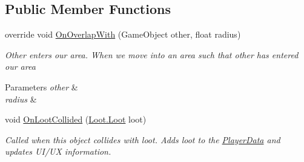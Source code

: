 \subsection*{Public Member Functions}
\begin{DoxyCompactItemize}
\item 
\hypertarget{class_skyrates_1_1_entity_1_1_entity_player_ship_ad4bfa608f86d94a38367b75f9fc32f21}{override void \hyperlink{class_skyrates_1_1_entity_1_1_entity_player_ship_ad4bfa608f86d94a38367b75f9fc32f21}{On\-Overlap\-With} (Game\-Object other, float radius)}\label{class_skyrates_1_1_entity_1_1_entity_player_ship_ad4bfa608f86d94a38367b75f9fc32f21}

\begin{DoxyCompactList}\small\item\em Other enters our area. When we move into an area such that other has entered our area 


\begin{DoxyParams}{Parameters}
{\em other} & \\
\hline
{\em radius} & \\
\hline
\end{DoxyParams}
 \end{DoxyCompactList}\item 
void \hyperlink{class_skyrates_1_1_entity_1_1_entity_player_ship_ac0928986c7d12c7c18bc3252d48eb15d}{On\-Loot\-Collided} (\hyperlink{class_skyrates_1_1_loot_1_1_loot}{Loot.\-Loot} loot)
\begin{DoxyCompactList}\small\item\em Called when this object collides with loot. Adds loot to the \hyperlink{class_skyrates_1_1_entity_1_1_entity_player_ship_a9dff4c7af9e4872a6bd58b821d12d3df}{Player\-Data} and updates U\-I/\-U\-X information. \end{DoxyCompactList}\end{DoxyCompactItemize}
